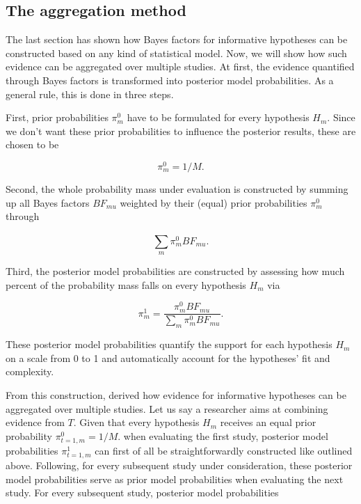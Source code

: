 \documentclass[11pt, a4paper]{article} %
\begin{document}
\subsection{The aggregation method}
\noindent The last section has shown how Bayes factors for informative hypotheses can be constructed based on any kind of statistical model. Now, we will show how such evidence can be aggregated over multiple studies. At first, the evidence quantified through Bayes factors is transformed into posterior model probabilities. As a general rule, this is done in three steps. 

First, prior probabilities $\pi^0_m$ have to be formulated for every hypothesis $H_m$. Since we don't want these prior probabilities to influence the posterior results, these are chosen to be 

\begin{equation}
\pi^0_m = 1/M.
\end{equation}


\noindent Second, the whole probability mass under evaluation is constructed by summing up all Bayes factors $BF_{mu}$ weighted by their (equal) prior probabilities $\pi^0_m$ through

\begin{equation}
\sum_{m}^{} \pi^0_m BF_{mu}.
\end{equation}

\noindent Third, the posterior model probabilities are constructed by assessing how much percent of the probability mass falls on every hypothesis $H_m$ via

\begin{equation}
\pi^1_m = \frac{\pi^0_m BF_{mu}}{\sum_{m}^{} \pi^0_m BF_{mu}}.
\end{equation}

\noindent These posterior model probabilities quantify the support for each hypothesis $H_m$ on a scale from 0 to 1 and automatically account for the hypotheses' fit and complexity. 

From this construction, \citet{Kuiper2013} derived how evidence for informative hypotheses can be aggregated over multiple studies. Let us say a researcher aims at combining evidence from $T$. Given that every hypothesis $H_m$ receives an equal prior probability $\pi^0_{t=1,m}=1/M$.  when evaluating the first study, posterior model probabilities $\pi^1_{t=1,m}$ can first of all be straightforwardly constructed like outlined above. Following, for every subsequent study under consideration, these posterior model probabilities serve as prior model probabilities when evaluating the next study. For every subsequent study, posterior model probabilities  
\end{document}
